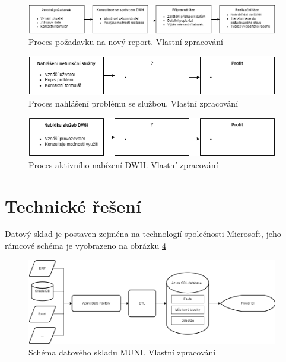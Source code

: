 \documentclass[
  digital,     %
  twoside,     %
  lof,         %
  lot,         %
]{fithesis4}
\begin{document}
    \begin{figure}[t]
        \begin{center}
            \includegraphics[width=11cm]{img/new_usecase.png}
        \end{center}
        \caption{Proces požadavku na nový report. Vlastní zpracování}
        \label{fig:new_report}
    \end{figure} 
    
        \begin{figure}[t]
        \begin{center}
            \includegraphics[width=11cm]{img/service_failure_process.png}
        \end{center}
        \caption{Proces nahlášení problému se službou. Vlastní zpracování}
        \label{fig:service_fail}
    \end{figure} 

    \begin{figure}[t]
        \begin{center}
            \includegraphics[width=11cm]{img/active_aquisition.png}
        \end{center}
        \caption{Proces aktivního nabízení DWH. Vlastní zpracování}
        \label{fig:active_offer}
    \end{figure} 
    
\section{Technické řešení}
Datový sklad je postaven zejména na technologií společnosti Microsoft, jeho rámcové schéma je vyobrazeno na obrázku \ref{fig:dwh_muni}

    \begin{figure}[t]
        \begin{center}
            \includegraphics[width=11cm]{img/dwh_muni.png}
        \end{center}
        \caption{Schéma datového skladu MUNI. Vlastní zpracování}
        \label{fig:dwh_muni}
    \end{figure} 
    
\end{document}
